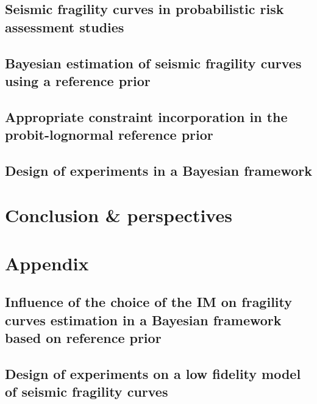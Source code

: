 \documentclass[a4paper]{book}
\begin{document}
\chapter{Seismic fragility curves in probabilistic risk assessment studies}\label{chap:frags-intro}




\chapter{Bayesian estimation of seismic fragility curves using a reference prior}\label{chap:prem}




\chapter{Appropriate constraint incorporation in the probit-lognormal reference prior}\label{chap:constrained-frags}




\chapter{Design of experiments in a Bayesian framework}\label{chap:doe}






\part{Conclusion \& perspectives}\label{part:conclusion}


\appendix
\part*{Appendix}\label{part:appendix}


\chapter{Influence of the choice of the IM on fragility curves estimation in a Bayesian framework based on reference prior}\label{app:chap:uncecomp}

\chapter{Design of experiments on a low fidelity model of seismic fragility curves}\label{app:chap:ESAIM}
\end{document}
